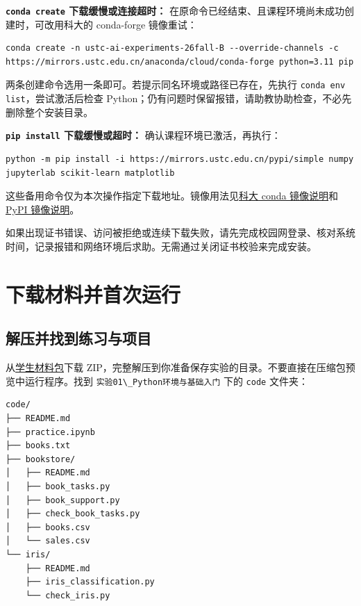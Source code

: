\documentclass[UTF8,a4paper,11pt,fontset=fandol]{ctexart}
\providecommand{\passthrough}[1]{#1}
\begin{document}
\textbf{\passthrough{\lstinline!conda create!} 下载缓慢或连接超时：} 在原命令已经结束、且课程环境尚未成功创建时，可改用科大的 conda-forge 镜像重试：

\begin{lstlisting}[language={}]
conda create -n ustc-ai-experiments-26fall-B --override-channels -c https://mirrors.ustc.edu.cn/anaconda/cloud/conda-forge python=3.11 pip
\end{lstlisting}

两条创建命令选用一条即可。若提示同名环境或路径已存在，先执行 \passthrough{\lstinline!conda env list!}，尝试激活后检查 Python；仍有问题时保留报错，请助教协助检查，不必先删除整个安装目录。

\textbf{\passthrough{\lstinline!pip install!} 下载缓慢或超时：} 确认课程环境已激活，再执行：

\begin{lstlisting}[language={}]
python -m pip install -i https://mirrors.ustc.edu.cn/pypi/simple numpy jupyterlab scikit-learn matplotlib
\end{lstlisting}

这些备用命令仅为本次操作指定下载地址。镜像用法见\href{https://mirrors.ustc.edu.cn/help/anaconda.html}{科大 conda 镜像说明}和\href{https://mirrors.ustc.edu.cn/help/pypi.html}{PyPI 镜像说明}。

如果出现证书错误、访问被拒绝或连续下载失败，请先完成校园网登录、核对系统时间，记录报错和网络环境后求助。无需通过关闭证书校验来完成安装。

\clearpage

\section{下载材料并首次运行}\label{ux4e0bux8f7dux6750ux6599ux5e76ux9996ux6b21ux8fd0ux884c}

\subsection{解压并找到练习与项目}\label{ux89e3ux538bux5e76ux627eux5230ux7ec3ux4e60ux4e0eux9879ux76ee}

从\href{../downloads/lab01-python-basics-26fall-B.zip}{学生材料包}下载 ZIP，完整解压到你准备保存实验的目录。不要直接在压缩包预览中运行程序。找到 \passthrough{\lstinline!实验01\_Python环境与基础入门!} 下的 \passthrough{\lstinline!code!} 文件夹：

\begin{lstlisting}[language={}]
code/
├── README.md
├── practice.ipynb
├── books.txt
├── bookstore/
│   ├── README.md
│   ├── book_tasks.py
│   ├── book_support.py
│   ├── check_book_tasks.py
│   ├── books.csv
│   └── sales.csv
└── iris/
    ├── README.md
    ├── iris_classification.py
    └── check_iris.py
\end{lstlisting}
\end{document}
